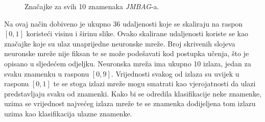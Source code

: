 \begin{figure}[htb]
    \centering
    \caption{Značajke za svih 10 znamenaka \emph{JMBAG}-a.}
    \label{fig:features-for-multiple-digits}
\end{figure}
Na ovaj način dobiveno je ukupno 36 udaljenosti koje se skaliraju na raspon $[0, 1]$ koristeći visinu i širinu slike.
Ovako skalirane udaljenosti koriste se kao značajke koje su ulaz unaprijedne neuronske mreže. Broj skrivenih slojeva
neuronske mreže nije fiksan te se može podešavati kod postupka učenja, što je opisano u sljedećem odjeljku. Neuronska
mreža ima ukupno 10 izlaza, jedan za svaku znamenku u rasponu $[0, 9]$. Vrijednosti svakog od izlaza su uvijek u rasponu
$[0, 1]$ te se stoga izlazi mreže mogu smatrati kao vjerojatnosti da ulazi predstavljaju svaku od znamenki. Kako bi se
odredila klasifikacije neke znamenke, uzima se vrijednost najvećeg izlaza mreže te se znamenka dodijeljena tom izlazu
uzima kao klasifikacija ulazne znamenke.


